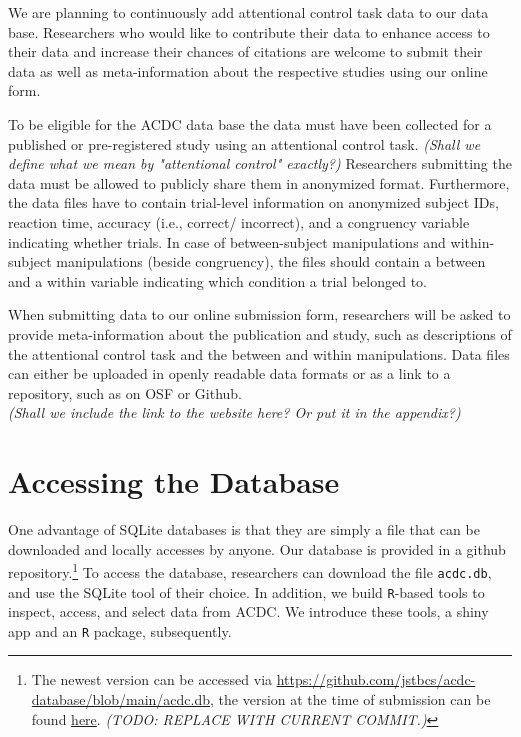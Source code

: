 \documentclass[
  man,floatsintext]{apa6}
\begin{document}
We are planning to continuously add attentional control task data to our data base. Researchers who would like to contribute their data to enhance access to their data and increase their chances of citations are welcome to submit their data as well as meta-information about the respective studies using our online form.

To be eligible for the ACDC data base the data must have been collected for a published or pre-registered study using an attentional control task. \emph{ (Shall we define what we mean by "attentional control" exactly?)} Researchers submitting the data must be allowed to publicly share them in anonymized format. Furthermore, the data files have to contain trial-level information on anonymized subject IDs, reaction time, accuracy (i.e., correct/ incorrect), and a congruency variable indicating whether trials. In case of between-subject manipulations and within-subject manipulations (beside congruency), the files should contain a between and a within variable indicating which condition a trial belonged to.

When submitting data to our online submission form, researchers will be asked to provide meta-information about the publication and study, such as descriptions of the attentional control task and the between and within manipulations. Data files can either be uploaded in openly readable data formats or as a link to a repository, such as on OSF or Github.\\
\emph{ (Shall we include the link to the website here? Or put it in the appendix?)}

\hypertarget{accessing-the-database}{%
\section{Accessing the Database}\label{accessing-the-database}}

One advantage of SQLite databases is that they are simply a file that can be downloaded and locally accesses by anyone. Our database is provided in a github repository.\footnote{The newest version can be accessed via \url{https://github.com/jstbcs/acdc-database/blob/main/acdc.db}, the version at the time of submission can be found \href{https://github.com/jstbcs/acdc-database/blob/main/acdc.db}{here}. \emph{ (TODO: REPLACE WITH CURRENT COMMIT.)}} To access the database, researchers can download the file \texttt{acdc.db}, and use the SQLite tool of their choice. In addition, we build \texttt{R}-based tools to inspect, access, and select data from ACDC. We introduce these tools, a shiny app and an \texttt{R} package, subsequently.
\end{document}
